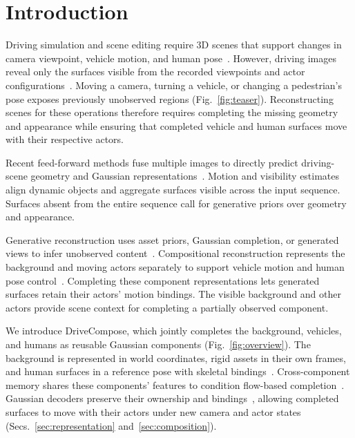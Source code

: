 \section{Introduction}
\label{sec:introduction}

Driving simulation and scene editing require 3D scenes that support changes in camera viewpoint, vehicle motion, and human pose~\cite{yang2023unisim,zhou2024hugsim}. However, driving images reveal only the surfaces visible from the recorded viewpoints and actor configurations~\cite{sun2020waymo,caesar2020nuscenes}. Moving a camera, turning a vehicle, or changing a pedestrian's pose exposes previously unobserved regions (Fig.~\ref{fig:teaser}). Reconstructing scenes for these operations therefore requires completing the missing geometry and appearance while ensuring that completed vehicle and human surfaces move with their respective actors.

Recent feed-forward methods fuse multiple images to directly predict driving-scene geometry and Gaussian representations~\cite{yang2025storm,chen2025dggt,yu2026streetforward,chi2026pointforward}. Motion and visibility estimates align dynamic objects and aggregate surfaces visible across the input sequence. Surfaces absent from the entire sequence call for generative priors over geometry and appearance.

Generative reconstruction uses asset priors, Gaussian completion, or generated views to infer unobserved content~\cite{yang2025genassets,liao2025complete,streetcrafter,zhu2025worldsplat}. Compositional reconstruction represents the background and moving actors separately to support vehicle motion and human pose control~\cite{yan2024street,chen2025omnire,zhou2024hugsim}. Completing these component representations lets generated surfaces retain their actors' motion bindings. The visible background and other actors provide scene context for completing a partially observed component.

We introduce DriveCompose, which jointly completes the background, vehicles, and humans as reusable Gaussian components (Fig.~\ref{fig:overview}). The background is represented in world coordinates, rigid assets in their own frames, and human surfaces in a reference pose with skeletal bindings~\cite{yan2024street,chen2025omnire}. Cross-component memory shares these components' features to condition flow-based completion~\cite{lipman2022flowmatching}. Gaussian decoders preserve their ownership and bindings~\cite{kerbl2023gaussians}, allowing completed surfaces to move with their actors under new camera and actor states (Secs.~\ref{sec:representation} and~\ref{sec:composition}).

